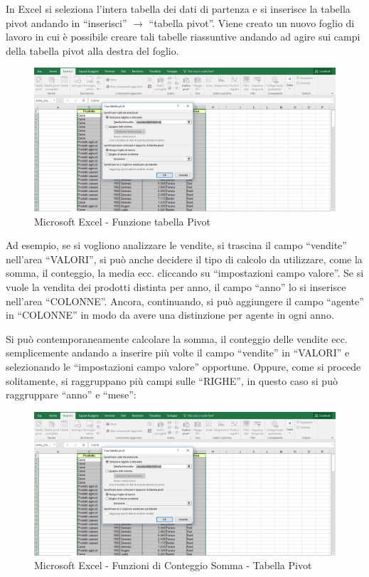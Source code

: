 In Excel si seleziona l’intera tabella dei dati di partenza e si inserisce la tabella pivot andando in “inserisci” $\rightarrow$ “tabella pivot”. Viene creato un nuovo foglio di lavoro in cui è possibile creare tali tabelle riassuntive andando ad agire sui campi della tabella pivot alla destra del foglio.  

\begin{center}
\begin{figure}[H]
\centering
\includegraphics[scale=0.8]{figures/excel_pivot.png}
\caption{Microsoft Excel - Funzione tabella Pivot}
\end{figure}
\end{center}

Ad esempio, se si vogliono analizzare le vendite, si trascina il campo “vendite” nell’area “VALORI”, si può anche decidere il tipo di calcolo da utilizzare, come la somma, il conteggio, la media ecc. cliccando su “impostazioni campo valore”. Se si vuole la vendita dei prodotti distinta per anno, il campo “anno” lo si inserisce nell’area “COLONNE”. Ancora, continuando, si può aggiungere il campo “agente” in “COLONNE” in modo da avere una distinzione per agente in ogni anno.   

Si può contemporaneamente calcolare la somma, il conteggio delle vendite ecc. semplicemente andando a inserire più volte il campo “vendite” in “VALORI” e selezionando le “impostazioni campo valore” opportune. Oppure, come si procede solitamente, si raggruppano più campi sulle “RIGHE”, in questo caso si può raggruppare “anno” e  “mese”:   

\begin{center}
\begin{figure}[H]
\centering
\includegraphics[scale=0.8]{figures/excel_pivot.png}
\caption{Microsoft Excel - Funzioni di Conteggio Somma - Tabella Pivot}
\end{figure}
\end{center}

